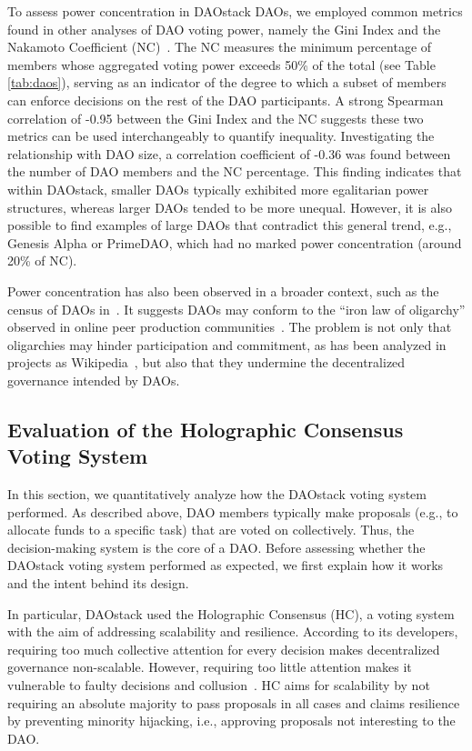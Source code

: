 \documentclass[10pt,lineno]{wlpeerj}
\begin{document}
To assess power concentration in DAOstack DAOs, we employed common metrics found in other analyses of DAO voting power, namely the Gini Index and the Nakamoto Coefficient (NC)~\citep{fritsch_analyzing_2024,barbereau_decentralised_2023}. The NC measures the minimum percentage of members whose aggregated voting power exceeds 50\% of the total (see Table \ref{tab:daos}), serving as an indicator of the degree to which a subset of members can enforce decisions on the rest of the DAO participants. A strong Spearman correlation of -0.95 between the Gini Index and the NC suggests these two metrics can be used interchangeably to quantify inequality. Investigating the relationship with DAO size, a correlation coefficient of -0.36 was found between the number of DAO members and the NC percentage. This finding indicates that within DAOstack, smaller DAOs typically exhibited more egalitarian power structures, whereas larger DAOs tended to be more unequal. However, it is also possible to find examples of large DAOs that contradict this general trend, e.g., Genesis Alpha or PrimeDAO, which had no marked power concentration (around 20\% of NC).

Power concentration has also been observed in a broader context, such as the census of DAOs in~\cite{pena-calvin_concentration_2024}. It suggests DAOs may conform to the ``iron law of oligarchy'' observed in online peer production communities~\citep{shaw_laboratories_2014}. The problem is not only that oligarchies may hinder participation and commitment, as has been analyzed in projects as Wikipedia~\citep{rijshouwer_wikipedia_2023}, but also that they undermine the decentralized governance intended by DAOs.

\subsection{Evaluation of the Holographic Consensus Voting System}
\label{subsec:voting_system}

In this section, we quantitatively analyze how the DAOstack voting system performed. As described above, DAO members typically make proposals (e.g., to allocate funds to a specific task) that are voted on collectively. Thus, the decision-making system is the core of a DAO. Before assessing whether the DAOstack voting system performed as expected, we first explain how it works and the intent behind its design.

In particular, DAOstack used the Holographic Consensus (HC), a voting system with the aim of addressing scalability and resilience. According to its developers, requiring too much collective attention for every decision makes decentralized governance non-scalable. However, requiring too little attention makes it vulnerable to faulty decisions and collusion~\citep{Field_2018}. HC aims for scalability by not requiring an absolute majority to pass proposals in all cases and claims resilience by preventing minority hijacking, i.e., approving proposals not interesting to the DAO.
\end{document}

